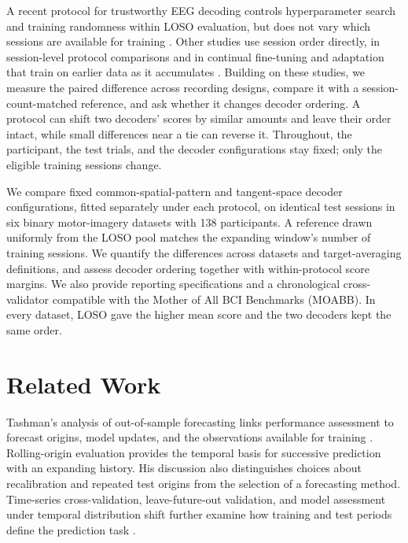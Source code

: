 \documentclass{ieeeaccess}
\begin{document}
A recent protocol for trustworthy EEG decoding controls hyperparameter search
and training randomness within LOSO evaluation, but does not vary which
sessions are available for training \cite{borra2025trustworthy}. Other studies
use session order directly, in session-level protocol comparisons
\cite{egger2024chrono} and in continual fine-tuning and adaptation that train on
earlier data as it accumulates \cite{wimpff2025continual,haxel2026edapt}.
Building on these studies, we measure the paired difference across recording
designs, compare it with a session-count-matched reference, and ask whether it
changes decoder ordering. A protocol can shift two decoders' scores by similar
amounts and leave their order intact, while small differences near a tie can
reverse it. Throughout, the participant, the test trials, and the decoder
configurations stay fixed; only the eligible training sessions change.

We compare fixed common-spatial-pattern and tangent-space decoder
configurations, fitted separately under each protocol, on identical test
sessions in six binary motor-imagery datasets with 138 participants. A
reference drawn uniformly from the LOSO pool matches the expanding window's
number of training sessions. We quantify the differences across datasets and
target-averaging definitions, and assess decoder ordering together with
within-protocol score margins. We also provide reporting specifications and a
chronological cross-validator compatible with the Mother of All BCI Benchmarks
(MOABB). In every dataset, LOSO gave the higher mean score and the two decoders
kept the same order.

\section{Related Work}
\label{sec:related}
Tashman's analysis of out-of-sample forecasting links performance assessment
to forecast origins, model updates, and the observations available for training
\cite{tashman2000outofsample}. Rolling-origin evaluation provides the temporal
basis for successive prediction with an expanding history. His discussion also
distinguishes choices about recalibration and repeated test origins from the
selection of a forecasting method. Time-series cross-validation,
leave-future-out validation, and model assessment under temporal distribution
shift further examine how training and test periods define the prediction task
\cite{bergmeir2012crossvalidation,burkner2020leavefuture,han2024temporal}.
\end{document}
